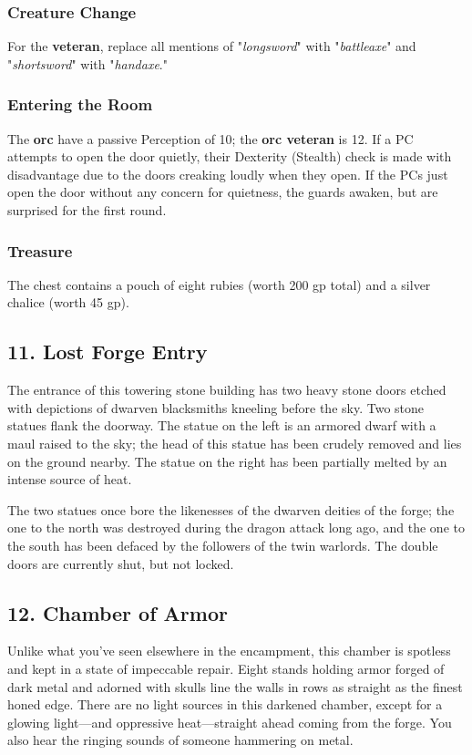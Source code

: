 \documentclass[10pt,a4paper,twoside,bg=print,twocolumn,openany,nodeprecatedcode]{dndbook}
\begin{document}
\subsubsection{Creature Change}
For the \textbf{veteran}, replace all mentions of "\textit{longsword}" with "\textit{battleaxe}" and "\textit{shortsword}" with "\textit{handaxe}."

\subsubsection{Entering the Room}
The \textbf{orc} have a passive Perception of 10; the \textbf{orc veteran} is 12. If a PC attempts to open the door quietly, their Dexterity (Stealth) check is made with disadvantage due to the doors creaking loudly when they open. If the PCs just open the door without any concern for quietness, the guards awaken, but are surprised for the first round.

\subsubsection{Treasure}
The chest contains a pouch of eight rubies (worth 200 gp total) and a silver chalice (worth 45 gp).

\subsection{11. Lost Forge Entry}
\begin{DndReadAloud}{}
The entrance of this towering stone building has two heavy stone doors etched with depictions of dwarven blacksmiths kneeling before the sky. Two stone statues flank the doorway. The statue on the left is an armored dwarf with a maul raised to the sky; the head of this statue has been crudely removed and lies on the ground nearby. The statue on the right has been partially melted by an intense source of heat.

\end{DndReadAloud}

The two statues once bore the likenesses of the dwarven deities of the forge; the one to the north was destroyed during the dragon attack long ago, and the one to the south has been defaced by the followers of the twin warlords. The double doors are currently shut, but not locked.

\subsection{12. Chamber of Armor}
\begin{DndReadAloud}{}
Unlike what you've seen elsewhere in the encampment, this chamber is spotless and kept in a state of impeccable repair. Eight stands holding armor forged of dark metal and adorned with skulls line the walls in rows as straight as the finest honed edge. There are no light sources in this darkened chamber, except for a glowing light—and oppressive heat—straight ahead coming from the forge. You also hear the ringing sounds of someone hammering on metal.

\end{DndReadAloud}
\end{document}
